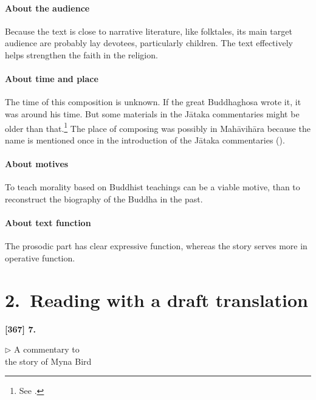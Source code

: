 \paragraph*{About the audience} Because the text is close to narrative literature, like folktales, its main target audience are probably lay devotees, particularly children. The text effectively helps strengthen the faith in the religion.
 
\paragraph*{About time and place} The time of this composition is unknown. If the great Buddhaghosa wrote it, it was around his time. But some materials in the J\=ataka commentaries might be older than that.\footnote{See \citealp[pp.~131--2]{hinuber:literature}.} The place of composing was possibly in Mah\=avih\=ara because the name is mentioned once in the introduction of the J\=ataka commentaries ().

\paragraph*{About motives} To teach morality based on Buddhist teachings can be a viable motive, than to reconstruct the biography of the Buddha in the past.

\paragraph*{About text function} The prosodic part has clear expressive function, whereas the story serves more in operative function.

{}
\section*{2.\ Reading with a draft translation}

\begin{center}
\textbf{[367] 7. }\par
$\triangleright$ A commentary to\\the story of Myna Bird
\end{center}

\setcounter{sennum}{0}

